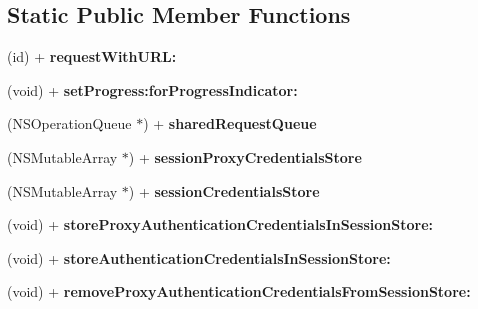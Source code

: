 \subsection*{Static Public Member Functions}
\begin{DoxyCompactItemize}
\item 
\hypertarget{interface_a_s_i_h_t_t_p_request_a7765ce1ee8f72ed8c94cdf8496ad402f}{
(id) + {\bfseries requestWithURL:}}
\label{interface_a_s_i_h_t_t_p_request_a7765ce1ee8f72ed8c94cdf8496ad402f}

\item 
\hypertarget{interface_a_s_i_h_t_t_p_request_aa832764dd51b0bfd741d1beebd768d40}{
(void) + {\bfseries setProgress:forProgressIndicator:}}
\label{interface_a_s_i_h_t_t_p_request_aa832764dd51b0bfd741d1beebd768d40}

\item 
\hypertarget{interface_a_s_i_h_t_t_p_request_a2c9ff89dc59561d5eb0e4990cac300e1}{
(NSOperationQueue $\ast$) + {\bfseries sharedRequestQueue}}
\label{interface_a_s_i_h_t_t_p_request_a2c9ff89dc59561d5eb0e4990cac300e1}

\item 
\hypertarget{interface_a_s_i_h_t_t_p_request_a6afdbd6d28c19e6a7f9ef6d0cf8b746a}{
(NSMutableArray $\ast$) + {\bfseries sessionProxyCredentialsStore}}
\label{interface_a_s_i_h_t_t_p_request_a6afdbd6d28c19e6a7f9ef6d0cf8b746a}

\item 
\hypertarget{interface_a_s_i_h_t_t_p_request_ad6bf65e22787790d6781f7c091c9e2d0}{
(NSMutableArray $\ast$) + {\bfseries sessionCredentialsStore}}
\label{interface_a_s_i_h_t_t_p_request_ad6bf65e22787790d6781f7c091c9e2d0}

\item 
\hypertarget{interface_a_s_i_h_t_t_p_request_a3b4a0286f50236a836d6321946aa2050}{
(void) + {\bfseries storeProxyAuthenticationCredentialsInSessionStore:}}
\label{interface_a_s_i_h_t_t_p_request_a3b4a0286f50236a836d6321946aa2050}

\item 
\hypertarget{interface_a_s_i_h_t_t_p_request_a29a3e43083c8878d4f789b4e2bc9b0bb}{
(void) + {\bfseries storeAuthenticationCredentialsInSessionStore:}}
\label{interface_a_s_i_h_t_t_p_request_a29a3e43083c8878d4f789b4e2bc9b0bb}

\item 
\hypertarget{interface_a_s_i_h_t_t_p_request_a129c7d20fcf78c1a2038aed3690eceb6}{
(void) + {\bfseries removeProxyAuthenticationCredentialsFromSessionStore:}}
\label{interface_a_s_i_h_t_t_p_request_a129c7d20fcf78c1a2038aed3690eceb6}


\end{DoxyCompactItemize}

